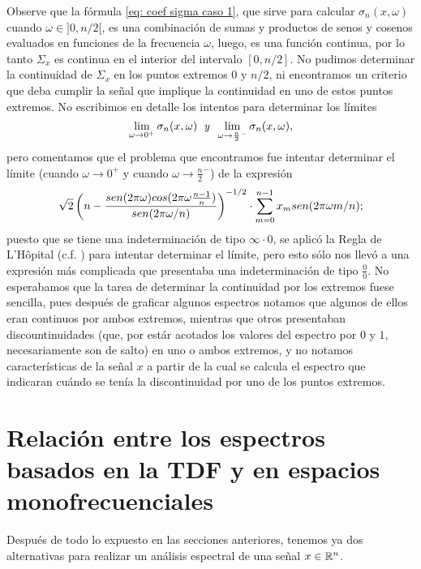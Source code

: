 Observe que la fórmula
\eqref{eq: coef sigma caso 1}, que sirve
para calcular $\sigma_{n} (x, \omega)$
cuando $\omega \in ]0, n/2[$, es una combinación
de sumas y productos de senos y cosenos
evaluados en funciones de la frecuencia $\omega$, luego, 
es una función continua, por lo tanto $\Sigma_{x}$
es continua en el interior del intervalo 
$[0, n/2]$. No pudimos determinar la
continuidad de $\Sigma_{x}$ en los puntos
extremos $0$ y $n/2$, ni encontramos un criterio que deba
cumplir la señal que implique la continuidad en uno
de estos puntos extremos.
No escribimos en detalle los intentos para
determinar los límites
\[
\lim\limits_{\omega \rightarrow 0^{+}}{\sigma_{n}(x, \omega)}
\hspace{0.2cm} \textit{y} \hspace{0.2cm}
\lim\limits_{\omega \rightarrow \frac{n}{2}^{-}}{\sigma_{n}(x, \omega)},
\]
pero comentamos que el problema que encontramos fue
intentar determinar el límite
(cuando $\omega \rightarrow 0^{+}$ y cuando $\omega \rightarrow \frac{n}{2}^{-}$)
de la expresión
\[
\sqrt{2} \left(
n - \frac{sen(2 \pi \omega) cos (2 \pi \omega \frac{n-1}{n})}{sen(2 \pi \omega/n)}
\right)^{-1/2}
\cdot
\sum\limits_{m=0}^{n-1}x_{m} sen(2 \pi \omega m/n);
\]
puesto que se tiene una indeterminación de tipo
$\infty \cdot 0$, se aplicó la Regla de L'Hôpital
(c.f. \cite{hopital}) 
para intentar determinar el límite, pero esto sólo
nos llevó a una expresión más complicada que presentaba una indeterminación
de tipo $\frac{0}{0}$. No esperabamos que la tarea
de determinar la continuidad por los extremos fuese sencilla,
pues después de graficar algunos espectros notamos que algunos
de ellos eran continuos por ambos extremos, mientras que otros
presentaban discountinuidades (que, por estár acotados los valores
del espectro por $0$ y $1$, necesariamente son de salto)
en uno o ambos extremos, y no notamos características de 
la señal $x$ a partir de la cual se calcula el espectro
que indicaran cuándo se tenía la discontinuidad por uno 
de los puntos extremos.





\section{Relación entre los espectros basados en la TDF y en espacios monofrecuenciales}

Después de todo lo expuesto en las secciones anteriores, tenemos
ya dos alternativas para realizar un análisis
espectral de una señal $x \in \mathbb{R}^{n}$.

